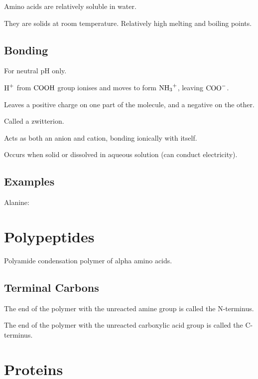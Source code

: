 \documentclass[a4paper,11pt]{article}
\begin{document}
Amino acids are relatively soluble in water.

They are solids at room temperature. Relatively high melting and boiling points.


\subsection{Bonding}

For neutral pH only.

$\ce{H+}$ from $\ce{COOH}$ group ionises and moves to form $\ce{NH3+}$, leaving
$\ce{COO-}$.

Leaves a positive charge on one part of the molecule, and a negative on the
other.

Called a zwitterion.

Acts as both an anion and cation, bonding ionically with itself.

Occurs when solid or dissolved in aqueous solution (can conduct electricity).


\subsection{Examples}

Alanine:

\begin{center}
\end{center}




\section{Polypeptides}

Polyamide condensation polymer of alpha amino acids.


\subsection{Terminal Carbons}

The end of the polymer with the unreacted amine group is called the N-terminus.

The end of the polymer with the unreacted carboxylic acid group is called the
C-terminus.




\section{Proteins}
\end{document}
